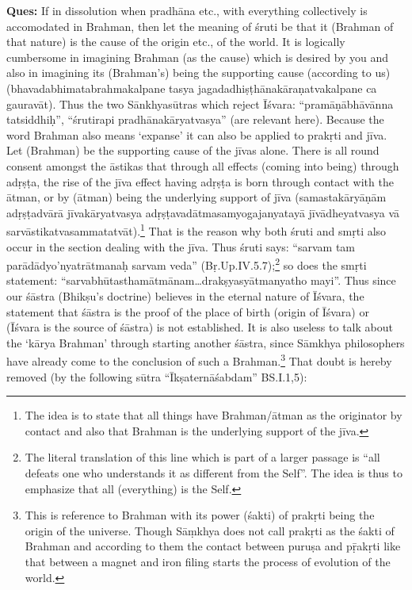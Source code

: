 \textbf{Ques:} If in dissolution when pradhāna etc., with everything collectively is accomodated in Brahman, then let the meaning of śruti be that it (Brahman of that nature) is the cause of the origin etc., of the world. It is logically cumbersome in imagining Brahman (as the cause) which is desired by you and also in imagining its (Brahman’s) being the supporting cause (according to us) (bhavadabhimatabrahmakalpane tasya jagadadhiṣṭhānakāraṇatvakalpane ca gauravāt). Thus the two Sānkhyasūtras which reject Īśvara: “pramāṇābhāvānna tatsiddhiḥ”, “śrutirapi pradhānakāryatvasya” (are relevant here). Because the word Brahman also means ‘expanse’ it can also be applied to prakṛti and jīva. Let (Brahman) be the supporting cause of the jīvas alone. There is all round consent amongst the āstikas that through all effects (coming into being) through adṛṣṭa, the rise of the jīva effect  having adṛṣṭa is born through contact with the ātman,  or by (ātman) being the underlying support of jīva  (samastakāryāṇām adṛṣṭadvārā jīvakāryatvasya adṛṣṭavadātmasamyogajanyatayā jīvādheyatvasya vā sarvāstikatvasa\-mmatatvāt).\footnote{The idea is to state that all things have Brahman/ātman as the originator by contact and also that Brahman is the underlying support of the jīva.} That is the reason why both śruti and smṛti also occur in the section dealing with the jīva. Thus śruti says: “sarvam tam parādādyo’nyatrātmanaḥ sarvam veda” (Bṛ.Up.IV.5.7);\footnote{The literal translation of this line which is part of a larger passage is “all defeats one who understands it as different from the Self”. The idea is thus to emphasize that all (everything) is the Self.} so does the smṛti statement: “sarvabhūtasthamātmānam…drakṣyasyātmanyatho mayi”. Thus since our śāstra (Bhikṣu’s doctrine) believes in the eternal nature of Īśvara, the statement that śāstra is the proof of the place of birth (origin of Īśvara) or (Īśvara is the source of śāstra) is not established. It is also useless to talk about the ‘kārya Brahman’ through starting another śāstra, since Sāmkhya philosophers have already come to the conclusion of such a Brahman.\footnote{This is reference to Brahman with its power (śakti) of prakṛti being the origin of the universe. Though Sāṃkhya does not call prakṛti as the śakti of Brahman and according to them the contact between puruṣa and pṝakṛti like that between a magnet and iron filing starts the process of evolution of the world.} That doubt is hereby removed (by the following sūtra “Īkṣaternāśabdam” BS.I.1,5):

